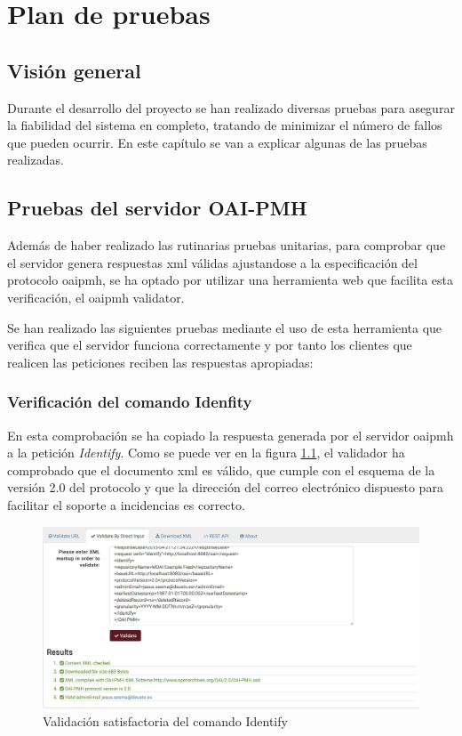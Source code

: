 \chapter{Plan de pruebas}

\section{Visión general}

Durante el desarrollo del proyecto se han realizado diversas pruebas para asegurar la fiabilidad del sistema en completo, tratando de minimizar el número de fallos que pueden ocurrir. En este capítulo se van a explicar algunas de las pruebas realizadas.

\section{Pruebas del servidor OAI-PMH}

Además de haber realizado las rutinarias pruebas unitarias, para comprobar que el servidor genera respuestas \acrshort{xml} válidas ajustandose a la especificación del protocolo \acrshort{oaipmh}, se ha optado por utilizar una herramienta web que facilita esta verificación, el \acrshort{oaipmh} validator.

Se han realizado las siguientes pruebas mediante el uso de esta herramienta que verifica que el servidor funciona correctamente y por tanto los clientes que realicen las peticiones reciben las respuestas apropiadas:

\subsection{Verificación del comando Idenfity}

En esta comprobación se ha copiado la respuesta generada por el servidor \acrshort{oaipmh} a la petición \textit{Identify}. Como se puede ver en la figura \ref{fig:identify}, el validador ha comprobado que el documento \acrshort{xml} es válido, que cumple con el esquema de la versión 2.0 del protocolo y que la dirección del correo electrónico dispuesto para facilitar el soporte a incidencias es correcto.

\begin{figure}[!htbp]
	\centering
	\includegraphics[scale=0.32]{fig/oaipmh_validations/Identify}
	\caption{Validación satisfactoria del comando Identify}
	\label{fig:identify}
\end{figure}

